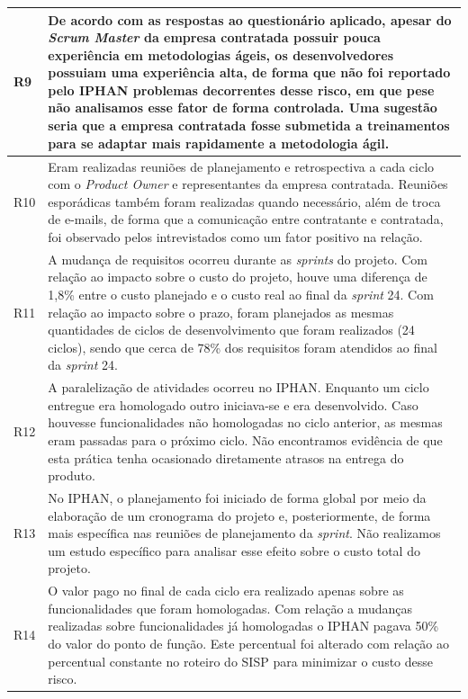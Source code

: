 \begin{longtable}{|p{2cm}|p{13cm}|}
R9                                                                & De acordo com as respostas ao questionário aplicado, apesar do \textit{Scrum Master} da empresa contratada possuir pouca experiência em metodologias ágeis, os desenvolvedores possuiam uma experiência alta, de forma que não foi reportado pelo IPHAN problemas decorrentes desse risco, em que pese não analisamos esse fator de forma controlada. Uma sugestão seria que a empresa contratada fosse submetida a treinamentos para se adaptar mais rapidamente a metodologia ágil.              \\ \hline
R10                                                               &  Eram realizadas reuniões de planejamento e retrospectiva a cada ciclo com o \textit{Product Owner} e representantes da empresa contratada. Reuniões esporádicas também foram realizadas quando necessário, além de troca de e-mails, de forma que a comunicação entre contratante e contratada, foi observado pelos intrevistados como um fator positivo na relação.                \\ \hline
R11                                                               & A mudança de requisitos ocorreu  durante as \textit{sprints} do projeto. Com relação ao impacto sobre o custo do projeto, houve uma diferença de 1,8\% entre o custo planejado e o custo real ao final da \textit{sprint} 24. Com relação ao impacto sobre o prazo, foram planejados as mesmas quantidades de ciclos de desenvolvimento que foram realizados (24 ciclos), sendo que cerca de 78\% dos requisitos foram atendidos ao final da \textit{sprint} 24.         \\ \hline
R12                                                               & A paralelização de atividades ocorreu no IPHAN. Enquanto um ciclo entregue era homologado outro iniciava-se e era desenvolvido. Caso houvesse funcionalidades não homologadas no ciclo anterior, as mesmas eram passadas para o próximo ciclo. Não encontramos evidência de que esta prática tenha ocasionado diretamente atrasos na entrega do produto.             \\ \hline
R13                                                               & No IPHAN, o planejamento foi iniciado de forma global por meio da elaboração de um cronograma do projeto e, posteriormente, de forma mais específica nas reuniões de planejamento da \textit{sprint}. Não realizamos um estudo específico para analisar esse efeito sobre o custo total do projeto.             \\ \hline
R14                                                               & O valor pago no final de cada ciclo era realizado apenas sobre as funcionalidades que foram homologadas. Com relação a mudanças realizadas sobre funcionalidades já homologadas o IPHAN pagava 50\% do valor do ponto de função. Este percentual foi alterado com relação ao percentual constante no roteiro do SISP para minimizar o custo desse risco.           \\ \hline

\end{longtable}
